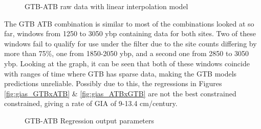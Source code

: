 \begin{figure}[h]
	\caption{GTB-ATB raw data with linear interpolation model}
	\label{fig:data_GTBxATB}
\end{figure}

The GTB ATB combination is similar to most of the combinations looked at so far,
windows from 1250 to 3050 ybp containing data for both sites. Two of these windows
fail to qualify for use under the filter due to the site counts differing by more
than 75\%, one from 1850-2050 ybp, and a second one from 2850 to 3050 ybp. Looking
at the graph, it can be seen that both of these windows coincide with ranges of
time where GTB has sparse data, making the GTB models predictions unreliable.
Possibly due to this, the
regressions in Figures \ref{fig:gias_GTBxATB} \& \ref{fig:gias_ATBxGTB} are not
the best constrained constrained, giving a rate of GIA of 9-13.4 cm/century.

\begin{figure}[h]
	\begin{flushleft}
	\end{flushleft}
	\caption{GTB-ATB Regression output parameters}
	\label{fig:GTBxATB_regression}
\end{figure}

\newpage

